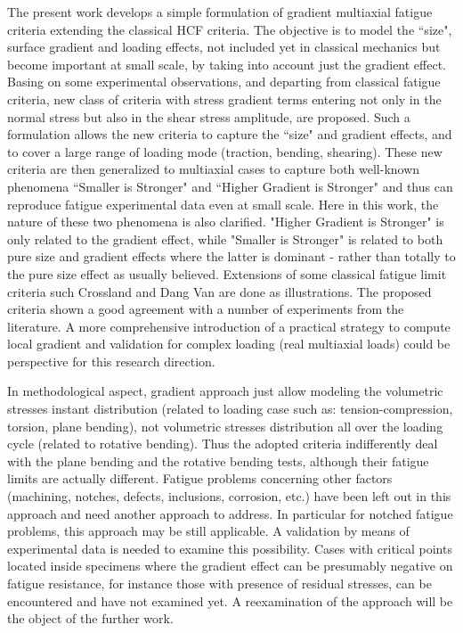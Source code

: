 The present work develops a simple formulation of gradient multiaxial fatigue criteria extending the
classical HCF criteria. The objective is to model the ``size", surface gradient and loading effects, not
included yet in classical mechanics but become important at small scale, by taking into account just the
gradient effect. Basing on some experimental observations, and departing from classical fatigue criteria, new class of
criteria with stress gradient terms entering not only in the normal stress but also in the shear stress
amplitude, are proposed. Such a formulation allows the new criteria to capture the ``size" and gradient
effects, and to cover a large range of loading mode (traction, bending, shearing). These new criteria
are then generalized to multiaxial cases to capture both well-known phenomena ``Smaller is Stronger"
and ``Higher Gradient is Stronger" and thus can reproduce fatigue experimental data even at small scale.
Here in this work, the nature of these two phenomena is also clarified. "Higher Gradient is Stronger" is
only related to the gradient effect, while "Smaller is Stronger" is related to both pure size and gradient
effects where the latter is dominant - rather than totally to the pure size effect as usually believed.
Extensions of some classical fatigue limit criteria such Crossland and Dang Van are done as illustrations.
The proposed criteria shown a good agreement with a number of experiments from the literature. A
more comprehensive introduction of a practical strategy to compute local gradient and validation  for complex loading (real multiaxial loads) could be perspective for this
research direction. 

In methodological aspect, gradient approach just allow modeling the volumetric stresses instant distribution (related to loading case such as: tension-compression, torsion, plane bending), not volumetric stresses distribution all over the loading cycle (related to rotative bending). Thus the adopted criteria indifferently deal with the plane bending and the rotative bending tests, although their fatigue limits are actually different. Fatigue problems concerning other factors (machining, notches, defects, inclusions, corrosion, etc.) have been left out in this approach and need another approach to address. In particular for notched fatigue problems, this approach may be still applicable. A validation by means of experimental data is needed to examine this possibility. Cases with critical points located inside specimens where the gradient effect can be presumably negative on fatigue resistance, for instance those with presence of residual stresses, can be encountered and have not examined yet. A reexamination of the approach will be the object of the further work.